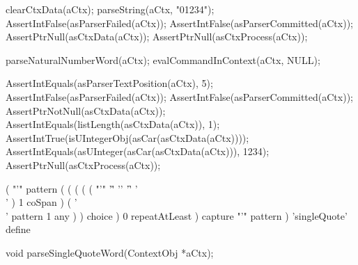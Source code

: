   clearCtxData(aCtx);
  parseString(aCtx, "01234");
  AssertIntFalse(asParserFailed(aCtx));
  AssertIntFalse(asParserCommitted(aCtx));
  AssertPtrNull(asCtxData(aCtx));
  AssertPtrNull(asCtxProcess(aCtx));
  
  parseNaturalNumberWord(aCtx);
  evalCommandInContext(aCtx, NULL);
  
  AssertIntEquals(asParserTextPosition(aCtx), 5);
  AssertIntFalse(asParserFailed(aCtx));
  AssertIntFalse(asParserCommitted(aCtx));
  AssertPtrNotNull(asCtxData(aCtx));
  AssertIntEquals(listLength(asCtxData(aCtx)), 1);
  AssertIntTrue(isUIntegerObj(asCar(asCtxData(aCtx))));
  AssertIntEquals(asUInteger(asCar(asCtxData(aCtx))), 1234);  
  AssertPtrNull(asCtxProcess(aCtx));
\stopCTest
\stopTestCase
\stopTestSuite

\startTestSuite[parseSingleQuoteWord]

\starttyping
(
  "'" pattern
  (
    ( 
      (
        ( ( "'" '\r' '\n' '\f' '\\' ) 1 coSpan )
        ( '\\' pattern 1 any )
      ) choice
    ) 0 repeatAtLeast
  ) capture
  "'" pattern
) 'singleQuote' define
\stoptyping

\startCHeader
void parseSingleQuoteWord(ContextObj *aCtx);
\stopCHeader

